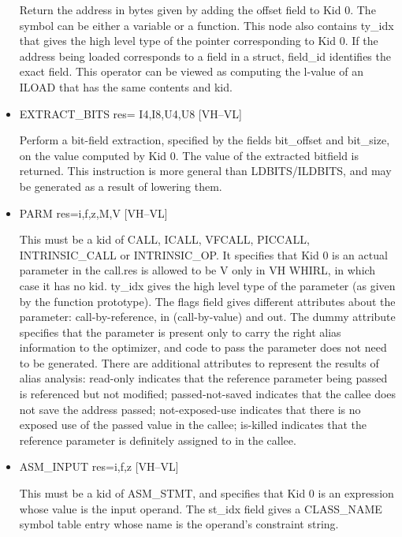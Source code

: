 \begin{itemize}
Return the address in bytes given by adding the offset field to
Kid 0. The symbol can be either a variable or a function. This node
also contains
ty\_idx that gives the high level type of the pointer corresponding
to Kid 0. If the address being loaded corresponds to a field in a
struct, field\_id identifies the exact field. This operator can be
viewed as computing the l-value of an
%
ILOAD that has the same contents and kid.

%
\item  EXTRACT\_BITS res= I4,I8,U4,U8 \hfill [VH--VL]

Perform a bit-field extraction, specified by the fields bit\_offset
and bit\_size, on the value computed by Kid 0. The value of the
extracted bitfield is returned. This instruction is more general
than
%
%
LDBITS/ILDBITS, and may be generated as a result of lowering
them.


\item
{}%
PARM res=i,f,z,M,V \hfill [VH--VL]

This must be a kid of CALL, ICALL, VFCALL,
%
PICCALL, 
%
INTRINSIC\_CALL or
%
INTRINSIC\_OP. It specifies that Kid 0 is an actual parameter in
the call.res is allowed to be V only in VH WHIRL, in which case it
has no kid.
ty\_idx gives the high level type of the parameter (as given by the
function prototype). The flags field gives different attributes
about the parameter: call-by-reference, in (call-by-value) and out.
The dummy attribute specifies that the parameter is present only
to carry the right alias information to the optimizer, and code to
pass the parameter does not need to be generated. There are
additional attributes to represent the results of alias analysis:
read-only indicates that the reference parameter being passed
is referenced but not modified; passed-not-saved indicates that the
callee does not save the address passed; not-exposed-use indicates
that there is no exposed use of the passed value in the callee;
is-killed indicates that the reference parameter is definitely
assigned to in the callee. 

%
\item  ASM\_INPUT res=i,f,z \hfill [VH--VL]

This must be a kid of ASM\_STMT, and specifies that Kid 0 is an
expression whose value is the input operand. The st\_idx field
gives a CLASS\_NAME symbol table entry whose name is the operand's constraint
string.


\end{itemize}
